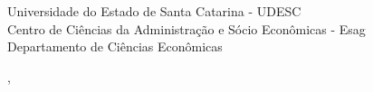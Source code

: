   \begin{capa}%
    \center
	\ABNTEXchapterfont\large{Universidade do Estado de Santa Catarina - UDESC \\ Centro de Ciências da Administração e Sócio Econômicas - Esag \\ Departamento de Ciências Econômicas}

    \vfill
    \ABNTEXchapterfont\bfseries\LARGE\imprimirtitulo
    \vfill

	\ABNTEXchapterfont\large\imprimirautor
	\vfill
%
		
    \large\imprimirlocal, \large\imprimirdata

    \vspace*{1cm}
  \end{capa}
